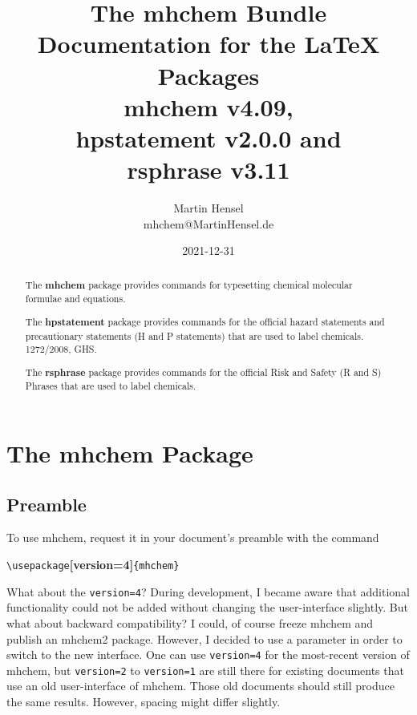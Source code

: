 \documentclass[a4paper,notitlepage,parskip=half]{scrreprt}
\newenvironment{annotation}{\bgroup\footnotesize}{\par\egroup}
\begin{document}
\title{%
  The mhchem Bundle\\[0.3em]
  \Large\textmd{%
    Documentation for the \LaTeX{} Packages\\
    mhchem v4.09,\\%
    hpstatement v2.0.0 and\\
    rsphrase v3.11}%
}
\author{%
  Martin Hensel\\
  mhchem\makebox[0pt][l]{\textcolor{white}{NOSPAM}}@MartinHensel\makebox[1pt][l]{\textcolor{white}{.}}.de%
}
\date{%
  2021-12-31%
}
\maketitle

\vfill

\begin{abstract}
  \noindent
  The \textbf{mhchem} package provides commands for typesetting chemical
  molecular formulae and equations.

  \medskip
  \noindent The \textbf{hpstatement} package provides commands for the
  official hazard statements and precautionary statements (H and P statements)
  that are used to label chemicals. 1272/2008, GHS.

  \medskip
  \noindent
  The \textbf{rsphrase} package provides commands for the official Risk and
  Safety (R and S) Phrases that are used to label chemicals.
\end{abstract}



\clearpage
\tableofcontents



\clearpage
\chapter{The mhchem Package}


\section{Preamble}

To use mhchem, request it in your document's preamble with the command

{\color{mhchem}\Large\verb|\usepackage|{\ttfamily\bfseries [version=4]}\verb|{mhchem}|}
\marginpar{\Large !}

\begin{annotation}
What about the \verb|version=4|? During development, I became aware that additional functionality could not be added without changing the user-interface slightly. But what about backward compatibility? I could, of course freeze mhchem and publish an mhchem2 package. However, I decided to use a parameter in order to switch to the new interface. One can use \verb|version=4| for the most-recent version of mhchem, but \verb|version=2| to \verb|version=1| are still there for existing documents that use an old user-interface of mhchem. Those old documents should still produce the same results. However, spacing might differ slightly.
\end{annotation}
\end{document}
